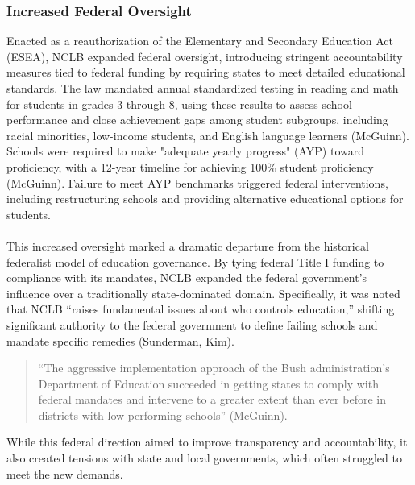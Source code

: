 \documentclass[11pt]{extarticle}
\begin{document}
\subsubsection{Increased Federal Oversight}
Enacted as a reauthorization of the Elementary and Secondary Education Act (ESEA), NCLB expanded federal oversight, introducing stringent accountability measures tied to federal funding by requiring states to meet detailed educational standards. 
The law mandated annual standardized testing in reading and math for students in grades 3 through 8, using these results to assess school performance and close achievement gaps among student subgroups, including racial minorities, low-income students, and English language learners (McGuinn). Schools were required to make "adequate yearly progress" (AYP) toward proficiency, with a 12-year timeline for achieving 100\% student proficiency (McGuinn). Failure to meet AYP benchmarks triggered federal interventions, including restructuring schools and providing alternative educational options for students.\\
\\
This increased oversight marked a dramatic departure from the historical federalist model of education governance. By tying federal Title I funding to compliance with its mandates, NCLB expanded the federal government’s influence over a traditionally state-dominated domain. Specifically, it was noted that NCLB ``raises fundamental issues about who controls education,” shifting significant authority to the federal government to define failing schools and mandate specific remedies (Sunderman, Kim).
\begin{quote}
  ``The aggressive implementation approach of the Bush administration’s Department of Education succeeded in getting states to comply with federal mandates and intervene to a greater extent than ever before in districts with low-performing schools'' (McGuinn).
\end{quote}
While this federal direction aimed to improve transparency and accountability, it also created tensions with state and local governments, which often struggled to meet the new demands.
\end{document}

